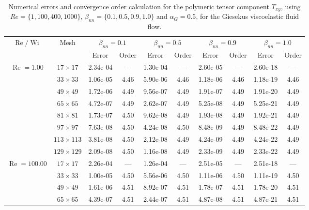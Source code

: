 \documentclass[preprint, 12pt]{elsarticle}
\begin{document}
\begin{center}
\begin{table}[H]
\caption{Numerical errors and convergence order calculation for the polymeric tensor component $T_{xy}$, using $Re=\{1,100,400,1000\}$, $\beta_{nn}=\{0.1,0.5,0.9,1.0\}$ and \mbox{$\alpha_G = 0.5$}, for the Giesekus viscoelastic fluid flow.\label{tab_GiesekusTxyalphaG05Wi5_10}}
\tiny{
    \begin{tabular*}{\textwidth}{@{\extracolsep\fill}cccccccccc@{}}
    \hline
    \multirow{2}{*}{$\operatorname{Re}/\operatorname{Wi}$} & \multirow{2}{*}{Mesh} & \multicolumn{2}{c}{$\beta_{nn}=0.1$}  & \multicolumn{2}{c}{$\beta_{nn}=0.5$}  & \multicolumn{2}{c}{$\beta_{nn}=0.9$}  & \multicolumn{2}{c}{$\beta_{nn}=1.0$}\\ %
     & & Error & Order & Error & Order & Error & Order & Error & Order \\
    \hline
    \multirow{7}{*}{$\operatorname{Re}=1.00$} & $17\times 17$ & 2.34e-04 & --- & 1.30e-04 & --- & 2.60e-05 & --- & 2.60e-18 & --- \\
    & $33\times 33$ & 1.06e-05 & 4.46 & 5.90e-06 & 4.46 & 1.18e-06 & 4.46 & 1.18e-19 & 4.46 \\
    & $49\times 49$ & 1.72e-06 & 4.49 & 9.56e-07 & 4.49 & 1.91e-07 & 4.49 & 1.91e-20 & 4.49 \\
    \multirow{3}{*}{$\operatorname{Wi}=5$} & $65\times 65$ & 4.72e-07 & 4.49 & 2.62e-07 & 4.49 & 5.25e-08 & 4.49 & 5.25e-21 & 4.49 \\
    & $81\times 81$ & 1.73e-07 & 4.50 & 9.62e-08 & 4.49 & 1.93e-08 & 4.49 & 1.92e-21 & 4.49 \\
    & $97\times 97$ & 7.63e-08 & 4.50 & 4.24e-08 & 4.50 & 8.48e-09 & 4.49 & 8.48e-22 & 4.49 \\
    & $113\times 113$ & 3.81e-08 & 4.50 & 2.12e-08 & 4.49 & 4.24e-09 & 4.49 & 4.24e-22 & 4.49 \\
    & $129\times 129$ & 2.09e-08 & 4.50 & 1.16e-08 & 4.49 & 2.33e-09 & 4.49 & 2.33e-22 & 4.49 \\
    \hline
    \multirow{7}{*}{$\operatorname{Re}=100.00$} & $17\times 17$ & 2.26e-04 & --- & 1.26e-04 & --- & 2.51e-05 & --- & 2.51e-18 & --- \\
    & $33\times 33$ & 1.00e-05 & 4.50 & 5.56e-06 & 4.50 & 1.11e-06 & 4.50 & 1.11e-19 & 4.50 \\
    & $49\times 49$ & 1.61e-06 & 4.51 & 8.92e-07 & 4.51 & 1.78e-07 & 4.51 & 1.78e-20 & 4.51 \\
    \multirow{3}{*}{$\operatorname{Wi}=5$} & $65\times 65$ & 4.39e-07 & 4.51 & 2.44e-07 & 4.51 & 4.87e-08 & 4.51 & 4.87e-21 & 4.51 \\

\end{tabular*}}
\end{table}
\end{center}
\end{document}
